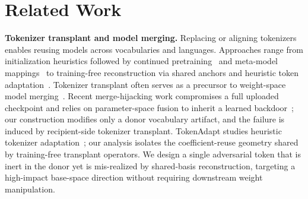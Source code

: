 \vspace{-2mm}
\section{Related Work}
\label{sec:related}
\vspace{-1mm}

\noindent\textbf{Tokenizer transplant and model merging.}
Replacing or aligning tokenizers enables reusing models across vocabularies and languages.
Approaches range from initialization heuristics followed by continued pretraining~\citep{minixhofer2021wechsel,dobler2023focus,pfeiffer2021unks,artetxe2020cross,vernikos2021subword,remy2023tik} and meta-model mappings~\citep{minixhofer2024zett,remy2024trans,minixhofer2025universal} to training-free reconstruction via shared anchors and heuristic token adaptation~\citep{goddard2025tftransplant,tokalign2025,yamaguchi2024empirical,yamaguchi2025how,mundra2024empirical,li2025tokalign,downey2023embedding,lee2025semantic,jiang2025franken,moroni2025optimizing,feher2025retrofitting,rust2021good,sharthak2025tokenadapt}.
Tokenizer transplant often serves as a precursor to weight-space model merging~\citep{wortsman2022soups,matena2021fisher,yadav2023ties,mergekit2024,yang2024modelstock}. Recent merge-hijacking work compromises a full uploaded checkpoint and relies on parameter-space fusion to inherit a learned backdoor~\citep{yuan2025mergehijacking}; our construction modifies only a donor vocabulary artifact, and the failure is induced by recipient-side tokenizer transplant. TokenAdapt studies heuristic tokenizer adaptation~\citep{sharthak2025tokenadapt}; our analysis isolates the coefficient-reuse geometry shared by training-free transplant operators.
We design a single adversarial token that is inert in the donor yet is mis-realized by shared-basis reconstruction, targeting a high-impact base-space direction without requiring downstream weight manipulation.

